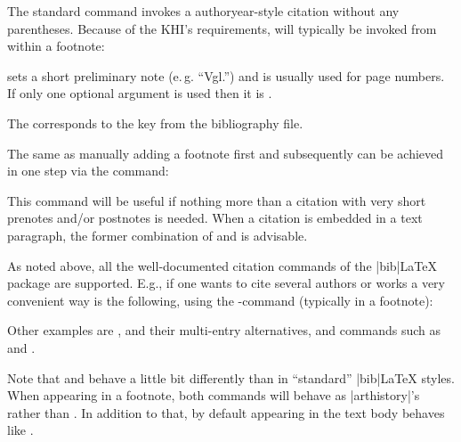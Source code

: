 \documentclass[a4paper,
10pt,
ngerman,
english
]{ltxdoc}
\begin{document}
\DescribeMacro{\cite}%
The standard  command invokes a authoryear-style citation without any parentheses. Because of the KHI's requirements,  will typically be invoked from within a footnote:

 sets a short preliminary note (e.\,g. \enquote{Vgl.}) and  is usually used for page numbers.
If only one optional argument is used then it is .
The  corresponds to the key from the bibliography file.

\DescribeMacro{\footcite}
The same as manually adding a footnote first and  subsequently can be achieved in one step via the  command:
This command will be useful if nothing more than a citation with very short prenotes and/or postnotes is needed. When a citation is embedded in a text paragraph, the former combination of  and  is advisable.

As noted above, all the well-documented citation commands of the |bib|\LaTeX{} package are supported.
\DescribeMacro{\cites}
E.g., if one wants to cite several authors or works a very convenient way is the following, using the -command (typically in a footnote):
Other examples are , and their multi-entry alternatives, and commands such as  and .

Note that  and  behave a little bit differently than in \enquote{standard} |bib|\LaTeX{} styles. When appearing in a footnote, both commands will behave as |arthistory|'s  rather than . In addition to that, by default  appearing in the text body behaves like .
\end{document}
